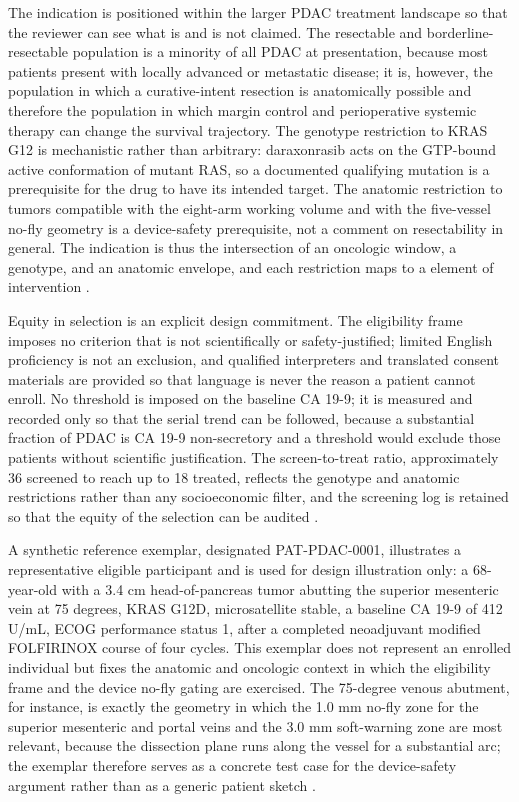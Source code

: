 The indication is positioned within the larger PDAC treatment landscape so that the
reviewer can see what is and is not claimed. The resectable and borderline-resectable
population is a minority of all PDAC at presentation, because most patients present
with locally advanced or metastatic disease; it is, however, the population in which
a curative-intent resection is anatomically possible and therefore the population in
which margin control and perioperative systemic therapy can change the survival
trajectory. The genotype restriction to KRAS G12 is mechanistic rather than
arbitrary: daraxonrasib acts on the GTP-bound active conformation of mutant RAS, so
a documented qualifying mutation is a prerequisite for the drug to have its intended
target. The anatomic restriction to tumors compatible with the eight-arm working
volume and with the five-vessel no-fly geometry is a device-safety prerequisite, not
a comment on resectability in general. The indication is thus the intersection of an
oncologic window, a genotype, and an anatomic envelope, and each restriction maps to
a element of intervention \cite{daraxwhipple,onpremwhippl}.

Equity in selection is an explicit design commitment. The eligibility frame imposes
no criterion that is not scientifically or safety-justified; limited English
proficiency is not an exclusion, and qualified interpreters and translated consent
materials are provided so that language is never the reason a patient cannot enroll.
No threshold is imposed on the baseline CA 19-9; it is measured and recorded only so
that the serial trend can be followed, because a substantial fraction of PDAC is CA
19-9 non-secretory and a threshold would exclude those patients without scientific
justification. The screen-to-treat ratio, approximately 36 screened to reach up to
18 treated, reflects the genotype and anatomic restrictions rather than any
socioeconomic filter, and the screening log is retained so that the equity of the
selection can be audited \cite{daraxwhipple,clintrustpai}.

A synthetic reference exemplar, designated PAT-PDAC-0001, illustrates a
representative eligible participant and is used for design illustration only: a
68-year-old with a 3.4 cm head-of-pancreas tumor abutting the superior mesenteric
vein at 75 degrees, KRAS G12D, microsatellite stable, a baseline CA 19-9 of 412
U/mL, ECOG performance status 1, after a completed neoadjuvant modified FOLFIRINOX
course of four cycles. This exemplar does not represent an enrolled individual but
fixes the anatomic and oncologic context in which the eligibility frame and the
device no-fly gating are exercised. The 75-degree venous abutment, for instance, is
exactly the geometry in which the 1.0 mm no-fly zone for the superior mesenteric and
portal veins and the 3.0 mm soft-warning zone are most relevant, because the
dissection plane runs along the vessel for a substantial arc; the exemplar therefore
serves as a concrete test case for the device-safety argument rather than as a
generic patient sketch \cite{daraxwhipple,onpremwhippl}.


